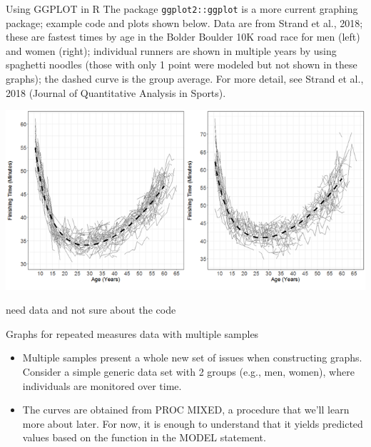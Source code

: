 \documentclass[
  9pt,
  ignorenonframetext,
]{beamer}
\begin{document}
\begin{frame}[fragile]{Using GGPLOT in R}
\protect\hypertarget{using-ggplot-in-r}{}
The package \texttt{ggplot2::ggplot} is a more current graphing package;
example code and plots shown below. Data are from Strand et al., 2018;
these are fastest times by age in the Bolder Boulder 10K road race for
men (left) and women (right); individual runners are shown in multiple
years by using spaghetti noodles (those with only 1 point were modeled
but not shown in these graphs); the dashed curve is the group average.
For more detail, see Strand et al., 2018 (Journal of Quantitative
Analysis in Sports).

\tiny

\begin{center}\includegraphics[width=0.6\linewidth]{figs_L2/L2-f0} \end{center}

\tiny
\end{frame}

\begin{frame}{}
\protect\hypertarget{section-4}{}
\alert {need data and not sure about the code}

\tiny\tiny
\end{frame}

\begin{frame}{Graphs for repeated measures data with multiple samples}
\protect\hypertarget{graphs-for-repeated-measures-data-with-multiple-samples}{}
\begin{itemize}
\item
  Multiple samples present a whole new set of issues when constructing
  graphs. Consider a simple generic data set with 2 groups (e.g., men,
  women), where individuals are monitored over time.
\item
  The curves are obtained from PROC MIXED, a procedure that we'll learn
  more about later. For now, it is enough to understand that it yields
  predicted values based on the function in the MODEL statement.
\end{itemize}
\end{frame}
\end{document}
